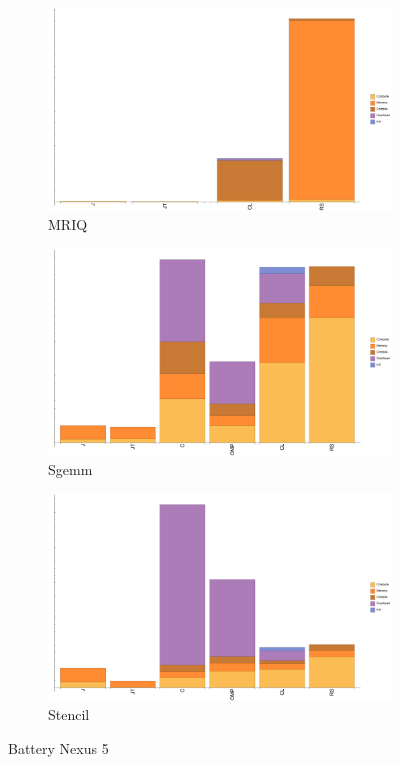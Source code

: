 \begin{figure}[ht]
  \begin{subfigure}[b]{0.5\textwidth}
      \centering
      \includegraphics[width=\textwidth]{data/bbattery_mriq_nexus5.pdf}
      \caption{MRIQ}
      \label{fig:MRIQ}
  \end{subfigure}

  \begin{subfigure}[b]{0.5\textwidth}
      \centering
      \includegraphics[width=\textwidth]{data/bbattery_sgemm_nexus5.pdf}
      \caption{Sgemm}\label{fig:Sgemm}
  \end{subfigure}
  \begin{subfigure}[b]{0.5\textwidth}
      \centering
      \includegraphics[width=\textwidth]{data/bbattery_stencil_nexus5.pdf}
      \caption{Stencil}
      \label{fig:Stencil}
  \end{subfigure}

  \caption{Battery Nexus 5}
\end{figure}

